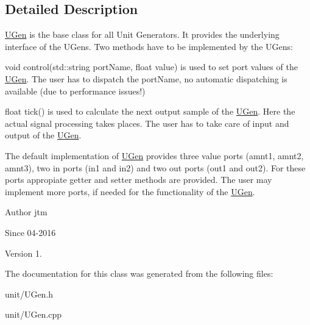 \subsection{Detailed Description}
\hyperlink{classunit_1_1UGen}{U\+Gen} is the base class for all Unit Generators. It provides the underlying interface of the U\+Gens. Two methods have to be implemented by the U\+Gens\+:

void control(std\+::string port\+Name, float value) is used to set port values of the \hyperlink{classunit_1_1UGen}{U\+Gen}. The user has to dispatch the port\+Name, no automatic dispatching is available (due to performance issues!)

float tick() is used to calculate the next output sample of the \hyperlink{classunit_1_1UGen}{U\+Gen}. Here the actual signal processing takes places. The user has to take care of input and output of the \hyperlink{classunit_1_1UGen}{U\+Gen}.

The default implementation of \hyperlink{classunit_1_1UGen}{U\+Gen} provides three value ports (amnt1, amnt2, amnt3), two in ports (in1 and in2) and two out ports (out1 and out2). For these ports appropiate getter and setter methods are provided. The user may implement more ports, if needed for the functionality of the \hyperlink{classunit_1_1UGen}{U\+Gen}.

\begin{DoxyAuthor}{Author}
jtm 
\end{DoxyAuthor}
\begin{DoxySince}{Since}
04-\/2016 
\end{DoxySince}
\begin{DoxyVersion}{Version}
1. 
\end{DoxyVersion}


The documentation for this class was generated from the following files\+:\begin{DoxyCompactItemize}
\item 
unit/U\+Gen.\+h\item 
unit/U\+Gen.\+cpp\end{DoxyCompactItemize}
